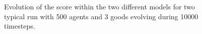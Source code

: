 \documentclass[paperwidth=42in, paperheight=33.1in,landscape,showframe,fontscale=.42]{baposter}
\begin{document}
\begin{poster}
{\begin{figure}[H]
\begin{tabular}{ c c}
		    \end{tabular}
		    \caption{Evolution of the score within the two different models for two typical run with 500 agents and 3 goods evolving during 10000 timesteps.}%
		    \label{fig:scoreEvol}
		\end{figure}


	    }




\end{poster}
\end{document}

